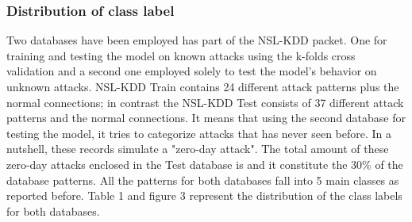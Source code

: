 \documentclass[twocolumn,11pt]{asme2ej}
\begin{document}
\subsubsection{Distribution of class label}

Two databases have been employed has part of the NSL-KDD packet. One for training and testing the model on known attacks using the k-folds cross validation and a second one employed solely to test the model's behavior on unknown attacks. NSL-KDD Train contains 24 different attack patterns plus the normal connections; in contrast the NSL-KDD Test consists of 37 different attack patterns and the normal connections. It means that using the second database for testing the model, it tries to categorize attacks that has never seen before. In a nutshell, these records simulate a "zero-day attack". The total amount of these zero-day attacks enclosed in the Test database is  and it constitute the 30\% of the database patterns. All the patterns for both databases fall into 5 main classes as reported before. Table 1 and figure 3 represent the distribution of the class labels for both databases.
\begin{table}[t]
\caption{Distribution of class label}
\begin{center}
\label{table_ASME}
\smallskip\noindent
{}
\end{center}
\end{table}
\end{document}

